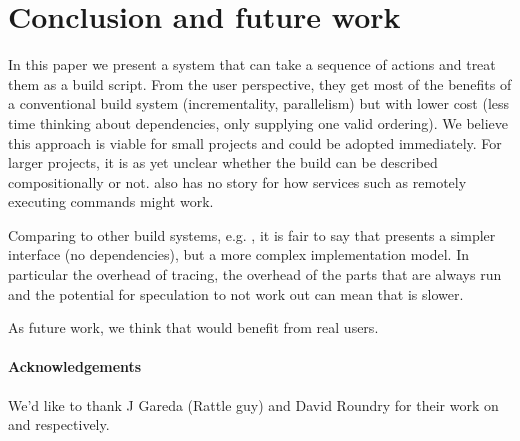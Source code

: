 \section{Conclusion and future work}
\label{sec:conclusion}

In this paper we present a system that can take a sequence of actions and treat them as a build script. From the user perspective, they get most of the benefits of a conventional build system (incrementality, parallelism) but with lower cost (less time thinking about dependencies, only supplying one valid ordering). We believe this approach is viable for small projects and could be adopted immediately. For larger projects, it is as yet unclear whether the build can be described compositionally or not. \Rattle also has no story for how services such as remotely executing commands might work.

Comparing \Rattle to other build systems, e.g. \Make, it is fair to say that \Rattle presents a simpler interface (no dependencies), but a more complex implementation model. In particular the overhead of tracing, the overhead of the parts that are always run and the potential for speculation to not work out can mean that \Rattle is slower.

As future work, we think that \Rattle would benefit from real users.

\paragraph{Acknowledgements} We'd like to thank J Gareda (Rattle guy) and David Roundry for their work on \Fsatrace and \libbigbro respectively.
